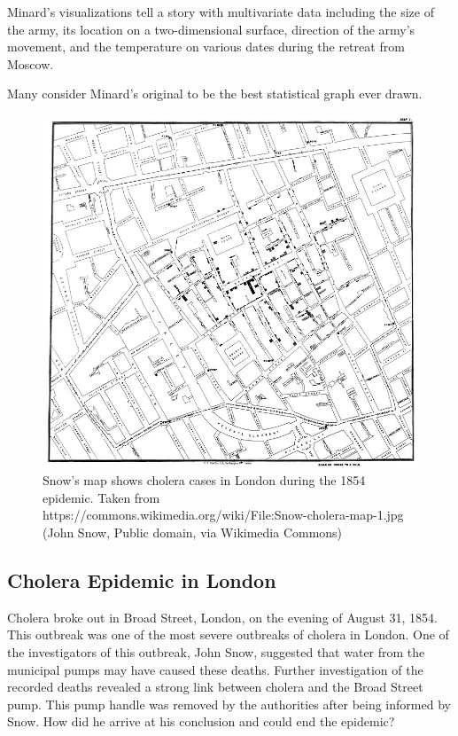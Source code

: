 \documentclass[
]{book}
\begin{document}
Minard's visualizations tell a story with multivariate data including the size of the army, its location on a two-dimensional surface, direction of the army's movement, and the temperature on various dates during the retreat from Moscow.

Many consider Minard's original to be the best statistical graph ever drawn.

\begin{figure}

{\centering \includegraphics[width=0.75\linewidth]{images/snow-cholera-map} 

}

\caption{Snow's map shows cholera cases in London during the 1854 epidemic. Taken from https://commons.wikimedia.org/wiki/File:Snow-cholera-map-1.jpg (John Snow, Public domain, via Wikimedia Commons)}\label{fig:unnamed-chunk-2}
\end{figure}

\hypertarget{cholera-epidemic-in-london}{%
\subsection{Cholera Epidemic in London}\label{cholera-epidemic-in-london}}

Cholera broke out in Broad Street, London, on the evening of August 31, 1854. This outbreak was one of the most severe outbreaks of cholera in London. One of the investigators of this outbreak, John Snow, suggested that water from the municipal pumps may have caused these deaths. Further investigation of the recorded deaths revealed a strong link between cholera and the Broad Street pump. This pump handle was removed by the authorities after being informed by Snow. How did he arrive at his conclusion and could end the epidemic?
\end{document}
